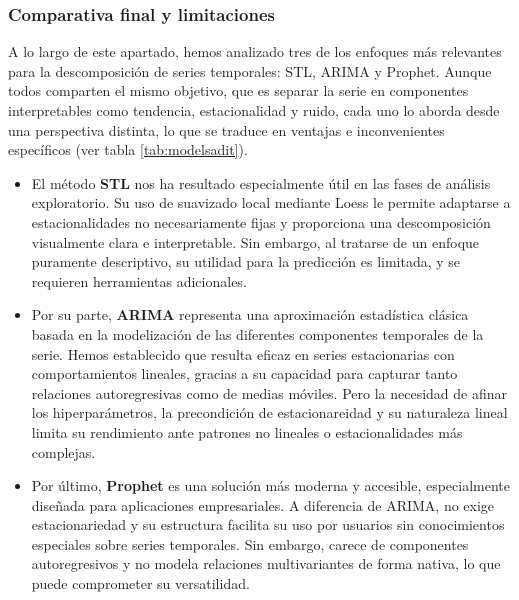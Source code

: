\subsubsection{Comparativa final y limitaciones}

A lo largo de este apartado, hemos analizado tres de los enfoques más relevantes para la descomposición de series temporales: {STL}, {ARIMA} y {Prophet}. Aunque todos comparten el mismo objetivo, que es separar la serie en componentes interpretables como tendencia, estacionalidad y ruido, cada uno lo aborda desde una perspectiva distinta, lo que se traduce en ventajas e inconvenientes específicos (ver tabla \ref{tab:modelsadit}).

\begin{itemize}


    \item El método \textbf{STL} nos ha resultado especialmente útil en las fases de análisis exploratorio. Su uso de suavizado local mediante Loess le permite adaptarse a estacionalidades no necesariamente fijas y proporciona una descomposición visualmente clara e interpretable. Sin embargo, al tratarse de un enfoque puramente descriptivo, su utilidad para la predicción es limitada, y se requieren herramientas adicionales.

    \item Por su parte, \textbf{ARIMA} representa una aproximación estadística clásica basada en la modelización de las diferentes componentes temporales de la serie. Hemos establecido que resulta eficaz en series estacionarias con comportamientos lineales, gracias a su capacidad para capturar tanto relaciones autoregresivas como de medias móviles. Pero la necesidad de afinar los hiperparámetros, la precondición de estacionareidad y su naturaleza lineal limita su rendimiento ante patrones no lineales o estacionalidades más complejas.

    \item Por último, \textbf{Prophet} es una solución más moderna y accesible, especialmente diseñada para aplicaciones empresariales. A diferencia de ARIMA, no exige estacionariedad y su estructura facilita su uso por usuarios sin conocimientos especiales sobre series temporales. Sin embargo, carece de componentes autoregresivos y no modela relaciones multivariantes de forma nativa, lo que puede comprometer su versatilidad.

\end{itemize}

